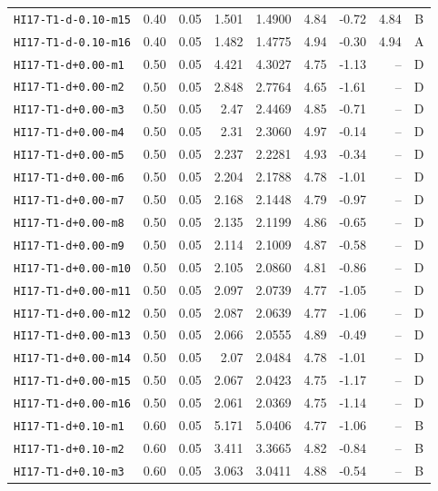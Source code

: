 \begin{longtable}{@{}lrrrrrrrc@{}}
\texttt{HI17-T1-d-0.10-m15} & 0.40 & 0.05 & 1.501 & 1.4900 & 4.84 & -0.72 & 4.84 & B\\
\texttt{HI17-T1-d-0.10-m16} & 0.40 & 0.05 & 1.482 & 1.4775 & 4.94 & -0.30 & 4.94 & A\\
\texttt{HI17-T1-d+0.00-m1} & 0.50 & 0.05 & 4.421 & 4.3027 & 4.75 & -1.13 & -- & D\\
\texttt{HI17-T1-d+0.00-m2} & 0.50 & 0.05 & 2.848 & 2.7764 & 4.65 & -1.61 & -- & D\\
\texttt{HI17-T1-d+0.00-m3} & 0.50 & 0.05 & 2.47 & 2.4469 & 4.85 & -0.71 & -- & D\\
\texttt{HI17-T1-d+0.00-m4} & 0.50 & 0.05 & 2.31 & 2.3060 & 4.97 & -0.14 & -- & D\\
\texttt{HI17-T1-d+0.00-m5} & 0.50 & 0.05 & 2.237 & 2.2281 & 4.93 & -0.34 & -- & D\\
\texttt{HI17-T1-d+0.00-m6} & 0.50 & 0.05 & 2.204 & 2.1788 & 4.78 & -1.01 & -- & D\\
\texttt{HI17-T1-d+0.00-m7} & 0.50 & 0.05 & 2.168 & 2.1448 & 4.79 & -0.97 & -- & D\\
\texttt{HI17-T1-d+0.00-m8} & 0.50 & 0.05 & 2.135 & 2.1199 & 4.86 & -0.65 & -- & D\\
\texttt{HI17-T1-d+0.00-m9} & 0.50 & 0.05 & 2.114 & 2.1009 & 4.87 & -0.58 & -- & D\\
\texttt{HI17-T1-d+0.00-m10} & 0.50 & 0.05 & 2.105 & 2.0860 & 4.81 & -0.86 & -- & D\\
\texttt{HI17-T1-d+0.00-m11} & 0.50 & 0.05 & 2.097 & 2.0739 & 4.77 & -1.05 & -- & D\\
\texttt{HI17-T1-d+0.00-m12} & 0.50 & 0.05 & 2.087 & 2.0639 & 4.77 & -1.06 & -- & D\\
\texttt{HI17-T1-d+0.00-m13} & 0.50 & 0.05 & 2.066 & 2.0555 & 4.89 & -0.49 & -- & D\\
\texttt{HI17-T1-d+0.00-m14} & 0.50 & 0.05 & 2.07 & 2.0484 & 4.78 & -1.01 & -- & D\\
\texttt{HI17-T1-d+0.00-m15} & 0.50 & 0.05 & 2.067 & 2.0423 & 4.75 & -1.17 & -- & D\\
\texttt{HI17-T1-d+0.00-m16} & 0.50 & 0.05 & 2.061 & 2.0369 & 4.75 & -1.14 & -- & D\\
\texttt{HI17-T1-d+0.10-m1} & 0.60 & 0.05 & 5.171 & 5.0406 & 4.77 & -1.06 & -- & B\\
\texttt{HI17-T1-d+0.10-m2} & 0.60 & 0.05 & 3.411 & 3.3665 & 4.82 & -0.84 & -- & B\\
\texttt{HI17-T1-d+0.10-m3} & 0.60 & 0.05 & 3.063 & 3.0411 & 4.88 & -0.54 & -- & B\\

\end{longtable}
